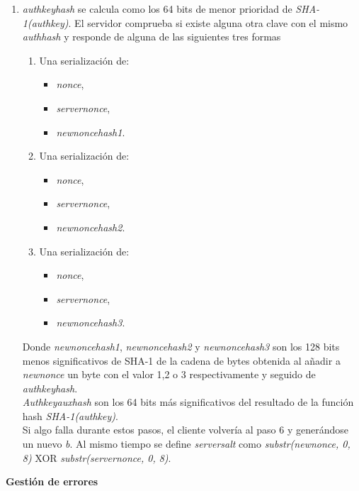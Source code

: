 \begin{enumerate}
	\item \emph{auth\textunderscore key\textunderscore hash} se calcula como los 64 bits de menor prioridad de \emph{SHA-1(auth\textunderscore key)}. El servidor comprueba si existe alguna otra clave con el mismo \emph{auth\textunderscore hash} y responde de alguna de las siguientes tres formas
	\begin{enumerate}
		\item Una serialización de: 
			\begin{itemize}
				\item \emph{nonce},
				\item \emph{server\textunderscore nonce},
				\item \emph{new\textunderscore nonce\textunderscore hash1}.
			\end{itemize}
		\item Una serialización de:
			\begin{itemize}
				\item \emph{nonce},	
				\item \emph{server\textunderscore nonce},
				\item \emph{new\textunderscore nonce\textunderscore hash2}.
			\end{itemize}
		\item Una serialización de:
			\begin{itemize}
				\item \emph{nonce},	
				\item \emph{server\textunderscore nonce},
				\item \emph{new\textunderscore nonce\textunderscore hash3}.
			\end{itemize}
	\end{enumerate}
	Donde \emph{new\textunderscore nonce\textunderscore hash1}, \emph{new\textunderscore nonce\textunderscore hash2} y \emph{new\textunderscore nonce\textunderscore hash3} son los 128 bits menos significativos de SHA-1 de la cadena de bytes obtenida al añadir a \emph{new\textunderscore nonce} un byte con el valor 1,2 o 3 respectivamente y seguido de \emph{auth\textunderscore key\textunderscore hash}.\\
	\emph{Auth\textunderscore key\textunderscore aux\textunderscore hash} son los 64 bits más significativos del resultado de la función hash \emph{SHA-1(auth\textunderscore key)}.\\
	Si algo falla durante estos pasos, el cliente volvería al paso 6 y generándose un nuevo \emph{b}. Al mismo tiempo se define \emph{server\textunderscore salt} como \emph{substr(new\textunderscore nonce, 0, 8)} XOR \emph{substr(server\textunderscore nonce, 0, 8)}.\\
	
\end{enumerate}
\textbf{Gestión de errores}


